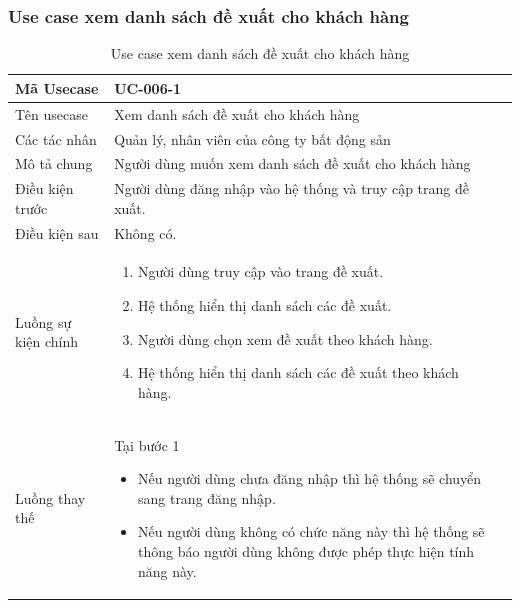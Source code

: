 \documentclass[12pt,a4paper]{article}
\begin{document}
    \subsubsection*{Use case xem danh sách đề xuất cho khách hàng}
    \begin{table}[H]
        \centering
        \begin{tabular}{|p{3.5cm}|p{11.5cm}|c|}
            \hline
            Mã Usecase      & UC-006-1                                                     \\
            \hline
            Tên usecase     & Xem danh sách đề xuất cho khách hàng                         \\
            \hline
            Các tác nhân    & Quản lý, nhân viên của công ty bất động sản                  \\
            \hline
            Mô tả chung     & Người dùng muốn xem danh sách đề xuất cho khách hàng         \\
            \hline

            Điều kiện trước & Người dùng đăng nhập vào hệ thống và truy cập trang đề xuất. \\
            \hline

            Điều kiện sau   & Không có.                                                    \\
            \hline

            Luồng sự kiện chính & \vspace{-.8cm}\begin{enumerate}
                                                    \item Người dùng truy cập vào trang đề xuất.
                                                    \item Hệ thống hiển thị danh sách các đề xuất.
                                                    \item Người dùng chọn xem đề xuất theo khách hàng.
                                                    \item Hệ thống hiển thị danh sách các đề xuất theo khách hàng.
            \end{enumerate}
            \\
            \hline
            Luồng thay thế & Tại bước 1\newline
            \vspace{-.8cm}\begin{itemize}
                              \item Nếu người dùng chưa đăng nhập thì hệ thống sẽ chuyển sang trang đăng nhập.
                              \item Nếu người dùng không có chức năng này thì hệ thống sẽ thông báo người dùng không được phép thực hiện tính năng này.
            \end{itemize}
            \\ \hline
        \end{tabular}
        \caption{Use case xem danh sách đề xuất cho khách hàng}
    \end{table}
\end{document}
